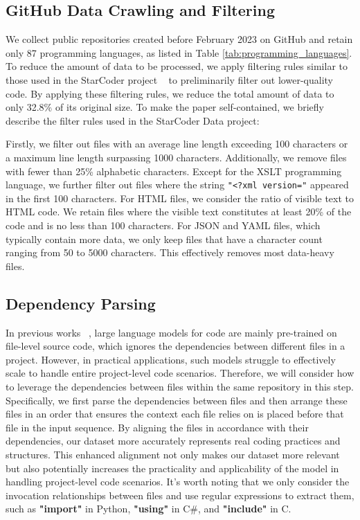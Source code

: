 \subsection{GitHub Data Crawling and Filtering}
\label{sec:rule_filering}
We collect public repositories created before February 2023 on GitHub and retain only 87 programming languages, as listed in Table \ref{tab:programming_languages}. To reduce the amount of data to be processed, we apply filtering rules similar to those used in the StarCoder project ~\citep{li2023starcoder} to preliminarily filter out lower-quality code. By applying these filtering rules, we reduce the total amount of data to only 32.8\% of its original size. To make the paper self-contained, we briefly describe the filter rules used in the StarCoder Data project:

Firstly, we filter out files with an average line length exceeding 100 characters or a maximum line length surpassing 1000 characters. Additionally, we remove files with fewer than 25\% alphabetic characters. Except for the XSLT programming language, we further filter out files where the string \texttt{"<?xml version="} appeared in the first 100 characters. For HTML files, we consider the ratio of visible text to HTML code. We retain files where the visible text constitutes at least 20\% of the code and is no less than 100 characters. For JSON and YAML files, which typically contain more data, we only keep files that have a character count ranging from 50 to 5000 characters. This effectively removes most data-heavy files.

\subsection{Dependency Parsing} In previous works ~\citep{li2023starcoder,roziere2023code,nijkamp2022codegen,chen2021evaluating}, large language models for code are mainly pre-trained on file-level source code, which ignores the dependencies between different files in a project. However, in practical applications, such models struggle to effectively scale to handle entire project-level code scenarios.  Therefore, we will consider how to leverage the dependencies between files within the same repository in this step. Specifically, we first parse the dependencies between files and then arrange these files in an order that ensures the context each file relies on is placed before that file in the input sequence. By aligning the files in accordance with their dependencies, our dataset more accurately represents real coding practices and structures. This enhanced alignment not only makes our dataset more relevant but also potentially increases the practicality and applicability of the model in handling project-level code scenarios. It's worth noting that we only consider the invocation relationships between files and use regular expressions to extract them, such as \textbf{"import"} in Python, \textbf{"using"} in C\#, and \textbf{"include"} in C.

